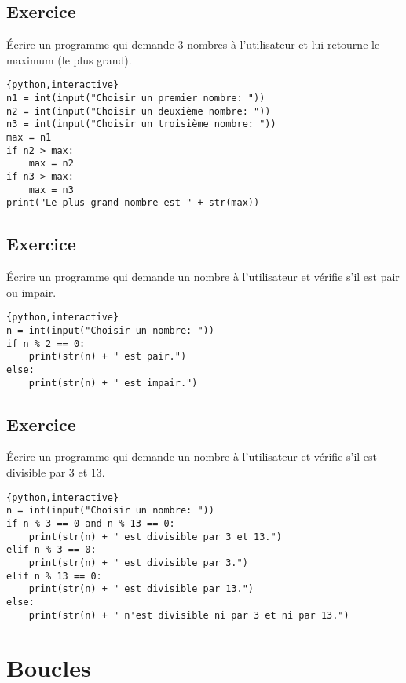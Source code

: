 \documentclass[a4paper,11pt]{article}
\begin{document}
\subsection{Exercice}
Écrire un programme qui demande 3 nombres à l'utilisateur et lui retourne le maximum (le plus grand).
\begin{solution}
\begin{verbatim}{python,interactive}
n1 = int(input("Choisir un premier nombre: "))
n2 = int(input("Choisir un deuxième nombre: "))
n3 = int(input("Choisir un troisième nombre: "))
max = n1
if n2 > max:
    max = n2
if n3 > max:
    max = n3
print("Le plus grand nombre est " + str(max))
\end{verbatim}
\end{solution}

\subsection{Exercice}
Écrire un programme qui demande un nombre à l'utilisateur et vérifie s'il est pair ou impair.
\begin{solution}
\begin{verbatim}{python,interactive}
n = int(input("Choisir un nombre: "))
if n % 2 == 0:
    print(str(n) + " est pair.")
else:
    print(str(n) + " est impair.")
\end{verbatim}
\end{solution}

\subsection{Exercice}
Écrire un programme qui demande un nombre à l'utilisateur et vérifie s'il est divisible par 3 et 13.
\begin{solution}
\begin{verbatim}{python,interactive}
n = int(input("Choisir un nombre: "))
if n % 3 == 0 and n % 13 == 0:
    print(str(n) + " est divisible par 3 et 13.")
elif n % 3 == 0:
    print(str(n) + " est divisible par 3.")
elif n % 13 == 0:
    print(str(n) + " est divisible par 13.")
else:
    print(str(n) + " n'est divisible ni par 3 et ni par 13.")
\end{verbatim}
\end{solution}

\section{Boucles}
\end{document}
